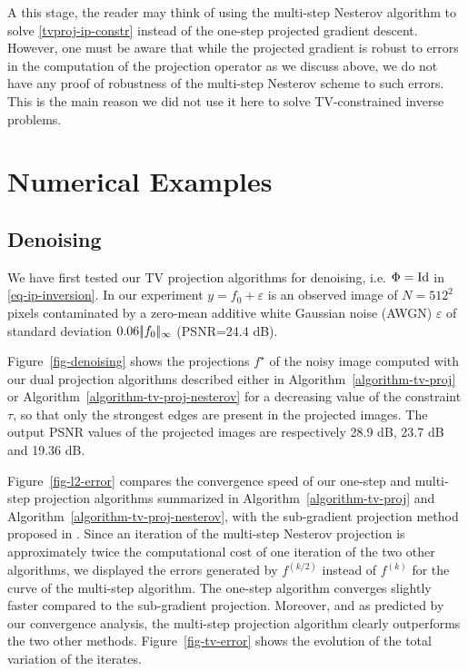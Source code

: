 \documentclass[11pt,nofonttune,a4paper]{IEEEtran}
\begin{document}
\begin{rem}
A this stage, the reader may think of using the multi-step Nesterov algorithm to solve \eqref{tvproj-ip-constr} instead of the one-step projected gradient descent. However, one must be aware that while the projected gradient is robust to errors in the computation of the projection operator as we discuss above, we do not have any proof of robustness of the multi-step Nesterov scheme to such errors. This is the main reason we did not use it here to solve TV-constrained inverse problems.
\end{rem}

\section{Numerical Examples}

\subsection{Denoising}
\label{subsec-denoising}

We have first tested our TV projection algorithms for denoising, i.e. $\Phi=\mathrm{Id}$ in \eqref{eq-ip-inversion}. In our experiment $y = f_0 + \varepsilon$ is an observed image of $N=512^2$ pixels contaminated by a zero-mean additive white Gaussian noise (AWGN) $\varepsilon$ of standard deviation $0.06 |\!| f_0 |\!|_\infty$ (PSNR=24.4 dB).

Figure~\ref{fig-denoising} shows the projections $f^\star$ of the noisy image computed with our dual projection algorithms described either in Algorithm~\ref{algorithm-tv-proj} or Algorithm~\ref{algorithm-tv-proj-nesterov} for a decreasing value of the constraint $\tau$, so that only the strongest edges are present in the projected images. The output PSNR values of the projected images are respectively 28.9 dB, 23.7 dB and 19.36 dB.

Figure~\ref{fig-l2-error} compares the convergence speed of our one-step and multi-step projection algorithms summarized in Algorithm~\ref{algorithm-tv-proj} and Algorithm~\ref{algorithm-tv-proj-nesterov}, with the sub-gradient projection method proposed in \cite{combettes-pesquer-tv,combettes-block}. Since an iteration of the multi-step Nesterov projection is approximately twice the computational cost of one iteration of the two other algorithms, we displayed the errors generated by $f^{(k/2)}$ instead of $f^{(k)}$ for the curve of the multi-step algorithm. The one-step algorithm converges slightly faster compared to the sub-gradient projection. Moreover, and as predicted by our convergence analysis,
the multi-step projection algorithm clearly outperforms the two other methods. Figure~\ref{fig-tv-error} shows the evolution of the total variation of the iterates.
\end{document}
